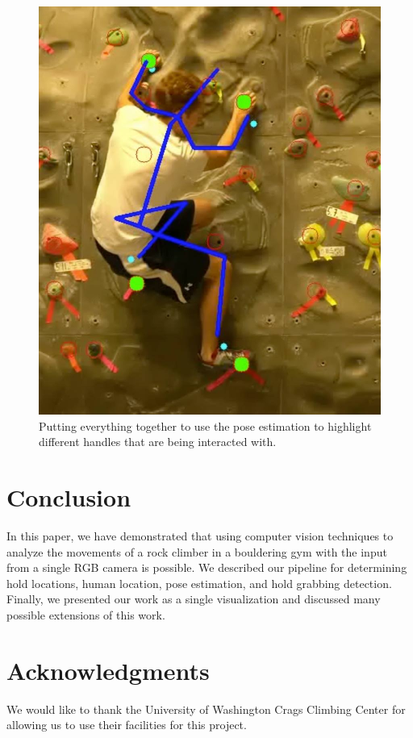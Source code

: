 \documentclass{chi2009}
\begin{document}
\begin{figure}[t]
\begin{center}
\includegraphics[width=\columnwidth]{figs/ryan_climbing.png}
\caption{\normalfont Putting everything together to use the pose estimation to highlight different handles that are being interacted with.}
\label{fig:flappy_game}
\end{center}
\end{figure}

\section{Conclusion}
In this paper, we have demonstrated that using computer vision techniques to analyze the movements of a rock climber in a bouldering gym with the input from a single RGB camera is possible. We described our pipeline for determining hold locations, human location, pose estimation, and hold grabbing detection. Finally, we presented our work as a single visualization and discussed many possible extensions of this work.

\section{Acknowledgments}

We would like to thank the University of Washington Crags Climbing Center for allowing us to use their facilities for this project.



\end{document}
